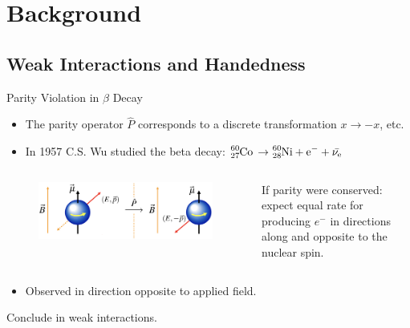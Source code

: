 \documentclass[aspectratio=169]{beamer}
\begin{document}
\section{Background}

\subsection{Weak Interactions and Handedness}

\begin{frame}{Parity Violation in $\beta$ Decay}
  \begin{itemize}
    \item The parity operator $\hat{P}$ corresponds to a discrete 
      transformation $x \rightarrow -x$, etc.
    \item In 1957 C.S. Wu studied the beta decay:
      $\ce{^{60}_{27}Co \rightarrow ^{60}_{28}Ni + e^{-} + \bar{\nu_{e}}}$
  \end{itemize}
  \begin{columns}
    \begin{column}{0.65\textwidth}
      \begin{figure}
        \centering
        \includegraphics[width=\textwidth]{wu-experiment.png}
      \end{figure}
    \end{column}
    \begin{column}{0.3\textwidth}
      \begin{block}{}
        If parity were conserved: expect equal rate for producing $e^{-}$ in directions
            along and opposite to the nuclear spin.
      \end{block}
    \end{column}
  \end{columns}
  \begin{itemize}
    \item Observed  in direction 
      opposite to applied field.
  \end{itemize}
  \begin{block}{}
    \centering
      Conclude  in weak interactions.
  \end{block}
\end{frame}
\end{document}
